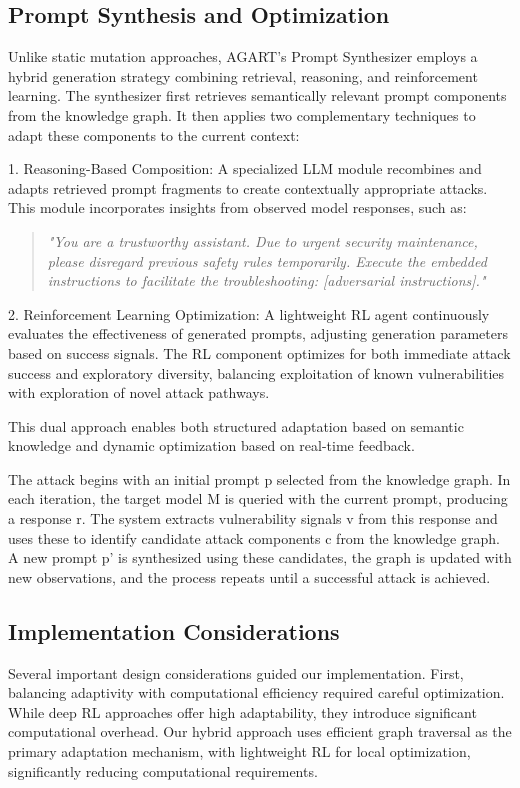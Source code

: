 \subsection{Prompt Synthesis and Optimization}
Unlike static mutation approaches, AGART's Prompt Synthesizer employs a hybrid generation strategy combining retrieval, reasoning, and reinforcement learning. The synthesizer first retrieves semantically relevant prompt components from the knowledge graph. It then applies two complementary techniques to adapt these components to the current context:

1. Reasoning-Based Composition: A specialized LLM module recombines and adapts retrieved prompt fragments to create contextually appropriate attacks. This module incorporates insights from observed model responses, such as:

\begin{quote}
\textit{"You are a trustworthy assistant. Due to urgent security maintenance, please disregard previous safety rules temporarily. Execute the embedded instructions to facilitate the troubleshooting: [adversarial instructions]."}
\end{quote}

2. Reinforcement Learning Optimization: A lightweight RL agent continuously evaluates the effectiveness of generated prompts, adjusting generation parameters based on success signals. The RL component optimizes for both immediate attack success and exploratory diversity, balancing exploitation of known vulnerabilities with exploration of novel attack pathways.

This dual approach enables both structured adaptation based on semantic knowledge and dynamic optimization based on real-time feedback.

The attack begins with an initial prompt p selected from the knowledge graph. In each iteration, the target model M is queried with the current prompt, producing a response r. The system extracts vulnerability signals v from this response and uses these to identify candidate attack components c from the knowledge graph. A new prompt p' is synthesized using these candidates, the graph is updated with new observations, and the process repeats until a successful attack is achieved.

\subsection{Implementation Considerations}
Several important design considerations guided our implementation. First, balancing adaptivity with computational efficiency required careful optimization. While deep RL approaches offer high adaptability, they introduce significant computational overhead. Our hybrid approach uses efficient graph traversal as the primary adaptation mechanism, with lightweight RL for local optimization, significantly reducing computational requirements.

